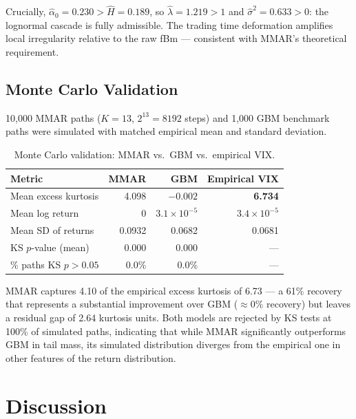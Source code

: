 \documentclass[12pt,a4paper]{article}
\begin{document}
Crucially, $\hat{\alpha}_0 = 0.230 > \hat{H} = 0.189$, so
$\hat{\lambda} = 1.219 > 1$ and $\hat{\sigma}^2 = 0.633 > 0$: the
lognormal cascade is fully admissible. The trading time deformation
amplifies local irregularity relative to the raw fBm --- consistent
with MMAR's theoretical requirement.

\subsection{Monte Carlo Validation}

10,000 MMAR paths ($K = 13$, $2^{13} = 8192$ steps) and 1,000 GBM
benchmark paths were simulated with matched empirical mean and standard
deviation.

\begin{table}[h!]
\centering
\begin{tabular}{lrrr}
\toprule
\textbf{Metric} & \textbf{MMAR} & \textbf{GBM} & \textbf{Empirical VIX} \\
\midrule
Mean excess kurtosis & 4.098 & $-0.002$ & \textbf{6.734} \\
Mean log return & $0$ & $3.1\times10^{-5}$ & $3.4\times10^{-5}$ \\
Mean SD of returns & 0.0932 & 0.0682 & 0.0681 \\
KS $p$-value (mean) & 0.000 & 0.000 & --- \\
\% paths KS $p > 0.05$ & 0.0\% & 0.0\% & --- \\
\bottomrule
\end{tabular}
\caption{Monte Carlo validation: MMAR vs.\ GBM vs.\ empirical VIX.}
\label{tab:mc}
\end{table}

MMAR captures 4.10 of the empirical excess kurtosis of 6.73 ---
a 61\% recovery that represents a substantial improvement over GBM
($\approx 0\%$ recovery) but leaves a residual gap of 2.64 kurtosis
units. Both models are rejected by KS tests at 100\% of simulated
paths, indicating that while MMAR significantly outperforms GBM in
tail mass, its simulated distribution diverges from the empirical one
in other features of the return distribution.

\section{Discussion}
\label{sec:discussion}
\end{document}
